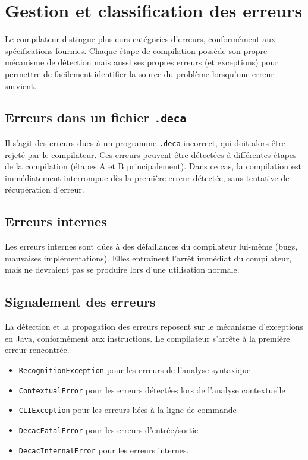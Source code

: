 \section{Gestion et classification des erreurs}
\noindent
Le compilateur distingue plusieurs catégories d'erreurs, conformément aux spécifications fournies. Chaque étape de compilation possède son propre mécanisme de détection mais aussi ses propres erreurs (et exceptions) pour permettre de facilement identifier la source du problème lorsqu'une erreur survient.

\subsection{Erreurs dans un fichier \texttt{.deca}}
\noindent
Il s'agit des erreurs dues à un programme \texttt{.deca} incorrect, qui doit alors être rejeté par le compilateur. Ces erreurs peuvent être détectées à différentes étapes de la compilation (étapes A et B principalement). Dans ce cas, la compilation est immédiatement interrompue dès la première erreur détectée, sans tentative de récupération d'erreur.


\subsection{Erreurs internes}
\noindent
Les erreurs internes sont dûes à des défaillances du compilateur lui-même (bugs, mauvaises implémentations). Elles entraînent l'arrêt immédiat du compilateur, mais ne devraient pas se produire lors d'une utilisation normale.

\subsection{Signalement des erreurs}
\noindent
La détection et la propagation des erreurs reposent sur le mécanisme d'exceptions en Java, conformément aux instructions. Le compilateur s'arrête à la première erreur rencontrée.

\begin{itemize}[label=$\circ$]
    \item \texttt{RecognitionException} pour les erreurs de l'analyse syntaxique
    \item \texttt{ContextualError} pour les erreurs détectées lors de l'analyse contextuelle
    \item \texttt{CLIException} pour les erreurs liées à la ligne de commande
    \item \texttt{DecacFatalError} pour les erreurs d'entrée/sortie
    \item \texttt{DecacInternalError} pour les erreurs internes.
\end{itemize}

